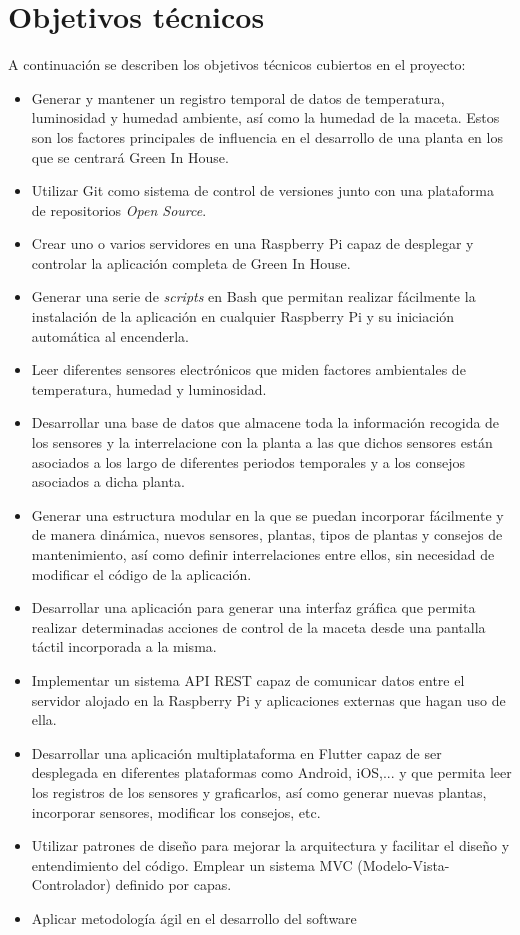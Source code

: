 \section{Objetivos técnicos}
A continuación se describen los objetivos técnicos cubiertos en el proyecto:
\begin{itemize}
    \item Generar y mantener un registro temporal de datos de temperatura, luminosidad y humedad ambiente, así como la humedad de la maceta. Estos son los factores principales de influencia en el desarrollo de una planta en los que se centrará Green In House.
    \item Utilizar Git como sistema de control de versiones junto con
    una plataforma de repositorios \textit{Open Source}.
    \item Crear uno o varios servidores en una Raspberry Pi capaz de desplegar y controlar la aplicación completa de Green In House.
    \item Generar una serie de \textit{scripts} en Bash que permitan realizar fácilmente la instalación de la aplicación en cualquier Raspberry Pi y su iniciación automática al encenderla.
    \item Leer diferentes sensores electrónicos que miden factores ambientales de temperatura, humedad y luminosidad.
    \item Desarrollar una base de datos que almacene toda la información recogida de los sensores y la interrelacione con la planta a las que dichos sensores están asociados a los largo de diferentes periodos temporales y a los consejos asociados a dicha planta.
    \item Generar una estructura modular en la que se puedan incorporar fácilmente y de manera dinámica, nuevos sensores, plantas, tipos de plantas y consejos de mantenimiento, así como definir interrelaciones entre ellos, sin necesidad de modificar el código de la aplicación.
    \item Desarrollar una aplicación para generar una interfaz gráfica que permita realizar determinadas acciones de control de la maceta desde una pantalla táctil incorporada a la misma. 
    \item Implementar un sistema API REST capaz de comunicar datos entre el servidor alojado en la Raspberry Pi y aplicaciones externas que hagan uso de ella.  
    \item Desarrollar una aplicación multiplataforma en Flutter capaz de ser desplegada en diferentes plataformas como Android, iOS,... y que permita leer los registros de los sensores y graficarlos, así como generar nuevas plantas, incorporar sensores, modificar los consejos, etc.   
    \item Utilizar patrones de diseño para mejorar la arquitectura y facilitar el diseño y entendimiento del código. Emplear un sistema MVC (Modelo-Vista-Controlador) definido por capas.   
    \item Aplicar metodología ágil en el desarrollo del software 
    
\end{itemize}

